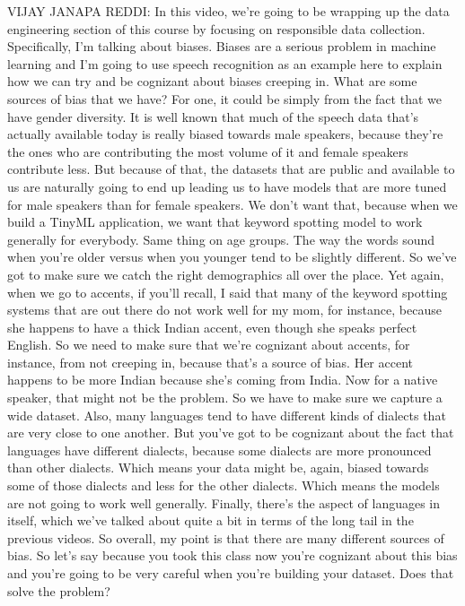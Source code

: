 VIJAY JANAPA REDDI: In this video, we're going
to be wrapping up the data engineering section of this course
by focusing on responsible data collection.
Specifically, I'm talking about biases.
Biases are a serious problem in machine learning
and I'm going to use speech recognition as an example
here to explain how we can try and be cognizant about biases creeping in.
What are some sources of bias that we have?
For one, it could be simply from the fact that we have gender diversity.
It is well known that much of the speech data that's actually available today
is really biased towards male speakers, because they're
the ones who are contributing the most volume of it
and female speakers contribute less.
But because of that, the datasets that are public and available to us
are naturally going to end up leading us to have
models that are more tuned for male speakers than for female speakers.
We don't want that, because when we build a TinyML application,
we want that keyword spotting model to work generally for everybody.
Same thing on age groups.
The way the words sound when you're older versus when you younger
tend to be slightly different.
So we've got to make sure we catch the right demographics all over the place.
Yet again, when we go to accents, if you'll recall,
I said that many of the keyword spotting systems that are out there
do not work well for my mom, for instance,
because she happens to have a thick Indian accent, even
though she speaks perfect English.
So we need to make sure that we're cognizant about accents, for instance,
from not creeping in, because that's a source of bias.
Her accent happens to be more Indian because she's coming from India.
Now for a native speaker, that might not be the problem.
So we have to make sure we capture a wide dataset.
Also, many languages tend to have different kinds of dialects
that are very close to one another.
But you've got to be cognizant about the fact
that languages have different dialects, because some dialects are
more pronounced than other dialects.
Which means your data might be, again, biased towards some of those dialects
and less for the other dialects.
Which means the models are not going to work well generally.
Finally, there's the aspect of languages in itself,
which we've talked about quite a bit in terms
of the long tail in the previous videos.
So overall, my point is that there are many different sources of bias.
So let's say because you took this class now you're cognizant about this bias
and you're going to be very careful when you're building your dataset.
Does that solve the problem?
